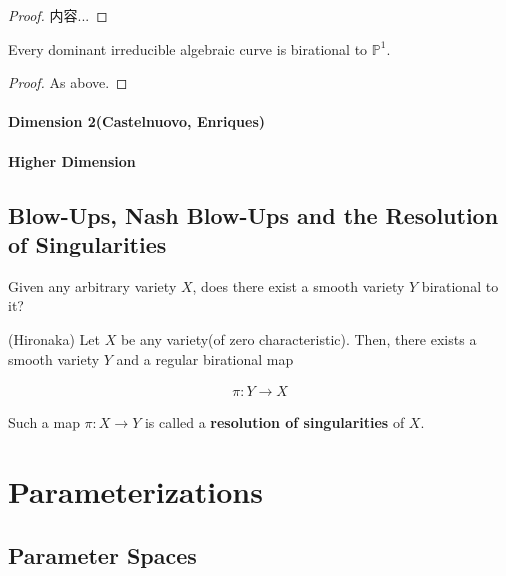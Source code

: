 \documentclass[Total.tex]{subfiles}
\begin{document}
		\begin{proof}
			内容...
		\end{proof}
		
		\begin{corollary}
			Every dominant irreducible algebraic curve is birational to $\mathbb{P}^1$.
		\end{corollary}
		
		\begin{proof}
			As above.
		\end{proof}
		
		\subsubsection{Dimension 2(Castelnuovo, Enriques)}
		
		\subsubsection{Higher Dimension}
		
		\section{Blow-Ups, Nash Blow-Ups and the Resolution of Singularities}
		
		\begin{prob}
			Given any arbitrary variety $X$, does there exist a smooth variety $Y$ birational to it?
		\end{prob}
		
		\begin{theorem}
			(Hironaka) Let $X$ be any variety(of zero characteristic). Then, there exists a smooth variety $Y$ and a regular birational map
			
			\begin{gather*}
				\pi:Y\rightarrow X
			\end{gather*}
		\end{theorem}
		
		\begin{Def}
			Such a map $\pi:X\rightarrow Y$ is called a \textbf{resolution of singularities} of $X$. 
		\end{Def}
		
	\chapter{Parameterizations}
		\section{Parameter Spaces}
		
\end{document}
